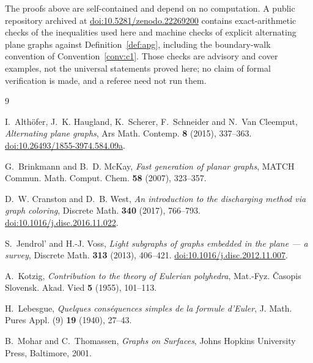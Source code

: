 \documentclass{baustms}
\theoremstyle{cupthm}
\theoremstyle{cupdefn}
\theoremstyle{cuprem}
\begin{document}
The proofs above are self-contained and depend on no computation. A public
repository archived at
\href{https://doi.org/10.5281/zenodo.22269200}{doi:10.5281/zenodo.22269200}
contains exact-arithmetic checks of the inequalities used here and machine checks
of explicit alternating plane graphs against Definition~\ref{def:apg}, including
the boundary-walk convention of Convention~\ref{conv:c1}. Those checks are
advisory and cover examples, not the universal statements proved here; no claim
of formal verification is made, and a referee need not run them.

\begin{thebibliography}{9}

I.~Alth\"ofer, J.~K. Haugland, K.~Scherer, F.~Schneider and N.~Van Cleemput,
\emph{Alternating plane graphs}, Ars Math. Contemp. \textbf{8} (2015),
337--363.
\href{https://doi.org/10.26493/1855-3974.584.09a}{doi:10.26493/1855-3974.584.09a}.

G.~Brinkmann and B.~D. McKay, \emph{Fast generation of planar graphs},
MATCH Commun. Math. Comput. Chem. \textbf{58} (2007), 323--357.

D.~W. Cranston and D.~B. West, \emph{An introduction to the discharging method
via graph coloring}, Discrete Math. \textbf{340} (2017), 766--793.
\href{https://doi.org/10.1016/j.disc.2016.11.022}{doi:10.1016/j.disc.2016.11.022}.

S.~Jendrol' and H.-J. Voss, \emph{Light subgraphs of graphs embedded in the
plane --- a survey}, Discrete Math. \textbf{313} (2013), 406--421.
\href{https://doi.org/10.1016/j.disc.2012.11.007}{doi:10.1016/j.disc.2012.11.007}.

A.~Kotzig, \emph{Contribution to the theory of Eulerian polyhedra},
Mat.-Fyz. \v{C}asopis Slovensk. Akad. Vied \textbf{5} (1955), 101--113.

H.~Lebesgue, \emph{Quelques cons\'equences simples de la formule d'Euler},
J. Math. Pures Appl. (9) \textbf{19} (1940), 27--43.

B.~Mohar and C.~Thomassen, \emph{Graphs on Surfaces}, Johns Hopkins University
Press, Baltimore, 2001.

\end{thebibliography}
\end{document}
